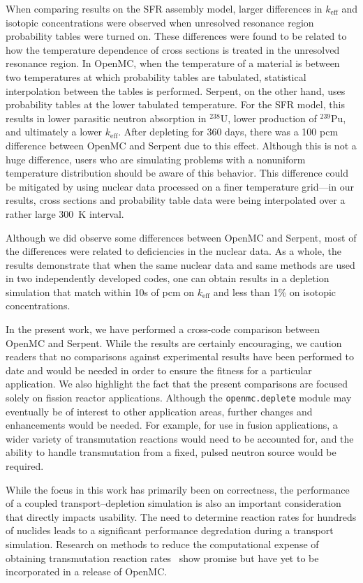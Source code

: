 \documentclass[3p,authoryear]{elsarticle}
\begin{document}
When comparing results on the SFR assembly model, larger differences in
$k_\text{eff}$ and isotopic concentrations were observed when unresolved
resonance region probability tables were turned on. These differences were found
to be related to how the temperature dependence of cross sections is treated in
the unresolved resonance region. In OpenMC, when the temperature of a material
is between two temperatures at which probability tables are tabulated,
statistical interpolation between the tables is performed. Serpent, on the other
hand, uses probability tables at the lower tabulated temperature. For the SFR
model, this results in lower parasitic neutron absorption in $^{238}$U, lower
production of $^{239}$Pu, and ultimately a lower $k_\text{eff}$. After depleting
for 360 days, there was a 100 pcm difference between OpenMC and Serpent due to
this effect. Although this is not a huge difference, users who are simulating
problems with a nonuniform temperature distribution should be aware of this
behavior. This difference could be mitigated by using nuclear data processed on
a finer temperature grid---in our results, cross sections and probability table
data were being interpolated over a rather large \SI{300}{\kelvin} interval.

Although we did observe some differences between OpenMC and Serpent, most of the
differences were related to deficiencies in the nuclear data. As a whole, the
results demonstrate that when the same nuclear data and same methods are used in
two independently developed codes, one can obtain results in a depletion
simulation that match within 10s of pcm on $k_\text{eff}$ and less than 1\% on
isotopic concentrations.

In the present work, we have performed a cross-code comparison between OpenMC
and Serpent. While the results are certainly encouraging, we caution readers
that no comparisons against experimental results have been performed to date and
would be needed in order to ensure the fitness for a particular application. We
also highlight the fact that the present comparisons are focused solely on
fission reactor applications. Although the \texttt{openmc.deplete} module may
eventually be of interest to other application areas, further changes and
enhancements would be needed. For example, for use in fusion applications, a
wider variety of transmutation reactions would need to be accounted for, and the
ability to handle transmutation from a fixed, pulsed neutron source would be
required.

While the focus in this work has primarily been on correctness, the performance
of a coupled transport--depletion simulation is also an important consideration
that directly impacts usability. The need to determine reaction rates for
hundreds of nuclides leads to a significant performance degredation during a
transport simulation. Research on methods to reduce the computational expense of
obtaining transmutation reaction rates~\citep{salcedoperez2019mc} show promise
but have yet to be incorporated in a release of OpenMC.
\end{document}

